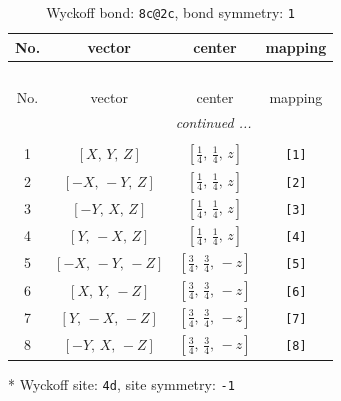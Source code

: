 \documentclass[fleqn,8pt]{jsarticle}
\begin{document}
\renewcommand{\arraystretch}{1.2}
\begin{longtable}{cccc}
\caption{Wyckoff bond: {\tt 8c@2c}, bond symmetry: {\tt 1}}
 \\
 \hline \hline
No. & vector & center & mapping \\ \hline \endfirsthead

\multicolumn{3}{l}{\tablename\ \thetable{}} \\
 \hline \hline
No. & vector & center & mapping \\ \hline \endhead

 \hline \hline
\multicolumn{3}{r}{\footnotesize\it continued ...} \\ \endfoot

 \hline \hline
\multicolumn{3}{r}{} \\ \endlastfoot

1 & $\left[ X,\, Y,\, Z \right]$ & $\left[ \frac{1}{4},\, \frac{1}{4},\, z \right]$ & {\tt [1]} \\ \hline
2 & $\left[ - X,\, - Y,\, Z \right]$ & $\left[ \frac{1}{4},\, \frac{1}{4},\, z \right]$ & {\tt [2]} \\ \hline
3 & $\left[ - Y,\, X,\, Z \right]$ & $\left[ \frac{1}{4},\, \frac{1}{4},\, z \right]$ & {\tt [3]} \\ \hline
4 & $\left[ Y,\, - X,\, Z \right]$ & $\left[ \frac{1}{4},\, \frac{1}{4},\, z \right]$ & {\tt [4]} \\ \hline
5 & $\left[ - X,\, - Y,\, - Z \right]$ & $\left[ \frac{3}{4},\, \frac{3}{4},\, - z \right]$ & {\tt [5]} \\ \hline
6 & $\left[ X,\, Y,\, - Z \right]$ & $\left[ \frac{3}{4},\, \frac{3}{4},\, - z \right]$ & {\tt [6]} \\ \hline
7 & $\left[ Y,\, - X,\, - Z \right]$ & $\left[ \frac{3}{4},\, \frac{3}{4},\, - z \right]$ & {\tt [7]} \\ \hline
8 & $\left[ - Y,\, X,\, - Z \right]$ & $\left[ \frac{3}{4},\, \frac{3}{4},\, - z \right]$ & {\tt [8]} \\
\end{longtable}
* Wyckoff site: {\tt 4d}, site symmetry: {\tt -1}
\renewcommand{\arraystretch}{1.2}
\end{document}
